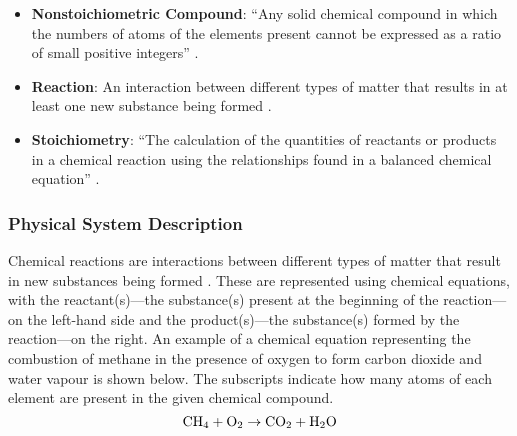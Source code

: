 \documentclass[12pt]{article}
\begin{document}
\begin{itemize}
  \item \textbf{Nonstoichiometric Compound}: ``Any solid chemical compound in
        which the numbers of atoms of the elements present cannot be expressed
        as a ratio of small positive integers''
        \cite{the_editors_of_encyclopaedia_britannica_nonstoichiometric_2010}.

  \item \textbf{Reaction}: An interaction between different types of matter that
        results in at least one new substance being formed
        \cite[p.~286]{lund_introduction_2023}.

  \item \textbf{Stoichiometry}: ``The calculation of the quantities of
        reactants or products in a chemical reaction using the relationships
        found in a balanced chemical equation''
        \cite[p.~337]{lund_introduction_2023}.

\end{itemize}

\subsubsection{Physical System Description} \label{sec_phySystDesc}

Chemical reactions are interactions between different types of matter that
result in new substances being formed \cite[p.~286]{lund_introduction_2023}.
These are represented using chemical equations, with the reactant(s)---the
substance(s) present at the beginning of the reaction---on the left-hand side
and the product(s)---the substance(s) formed by the reaction---on the right. An
example of a chemical equation representing the combustion of methane in the
presence of oxygen to form carbon dioxide and water vapour is shown below. The
subscripts indicate how many atoms of each element are present in the given
chemical compound.
$$
  \ce{CH4} + \ce{O2} \rightarrow \ce{CO2} + \ce{H2O}
$$
\end{document}
